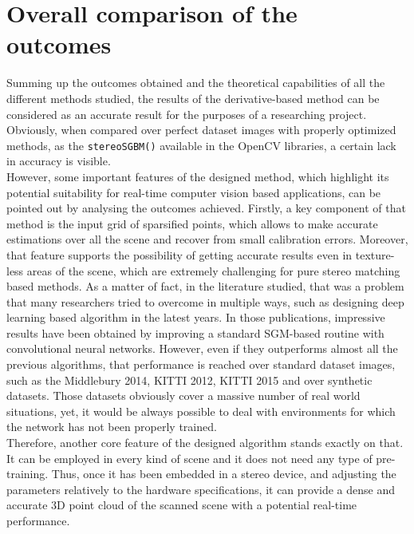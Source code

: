 \section{Overall comparison of the outcomes}
\label{section:method-comparison}

Summing up the outcomes obtained and the theoretical capabilities of all the different methods studied, the results of the derivative-based method can be considered as an accurate result for the purposes of a researching project.
Obviously, when compared over perfect dataset images with properly optimized methods, as the \texttt{stereoSGBM()} available in the OpenCV libraries, a certain lack in accuracy is visible.\\
However, some important features of the designed method, which highlight its potential suitability for real-time computer vision based applications, can be pointed out by analysing the outcomes achieved.
Firstly, a key component of that method is the input grid of sparsified points, which allows to make accurate estimations over all the scene and recover from small calibration errors.
Moreover, that feature supports the possibility of getting accurate results even in texture-less areas of the scene, which are extremely challenging for pure stereo matching based methods.
As a matter of fact, in the literature studied, that was a problem that many researchers tried to overcome in multiple ways, such as designing deep learning based algorithm in the latest years.
In those publications, impressive results have been obtained by improving a standard SGM-based routine with convolutional neural networks.
However, even if they outperforms almost all the previous algorithms, that performance is reached over standard dataset images, such as the Middlebury 2014, KITTI 2012, KITTI 2015 and over synthetic datasets.
Those datasets obviously cover a massive number of real world situations, yet, it would be always possible to deal with environments for which the network has not been properly trained. \\  
Therefore, another core feature of the designed algorithm stands exactly on that.
It can be employed in every kind of scene and it does not need any type of pre-training.
Thus, once it has been embedded in a stereo device, and adjusting the parameters relatively to the hardware specifications, it can provide a dense and accurate 3D point cloud of the scanned scene with a potential real-time performance.
